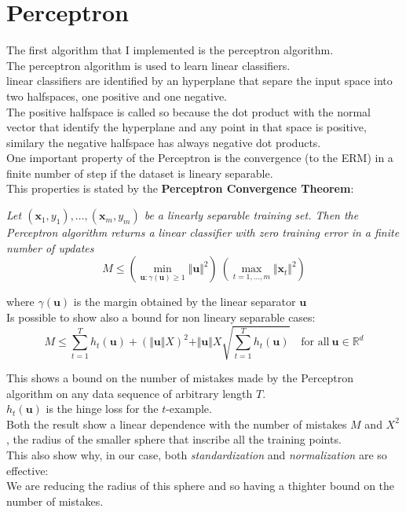 \newpage
\section{Perceptron}

The first algorithm that I implemented is the perceptron algorithm.\\
The perceptron algorithm is used to learn linear classifiers.\\
linear classifiers are identified by an hyperplane that separe the input space into two halfspaces, one positive and one negative.\\
The positive halfspace is called so because the dot product with the normal vector that identify the hyperplane and any point in that space is positive, similary the negative halfspace has always negative dot products.\\
One important property of the Perceptron is the convergence (to the ERM) in a finite number of step if the dataset is lineary separable.\\
This properties is stated by the \textbf{Perceptron Convergence Theorem}:

\textit{Let $(\boldsymbol{x}_1 , y_1 ), \dots, (\boldsymbol{x}_m , y_m)$ be a linearly separable training set. Then the Perceptron algorithm returns a linear classifier with zero training error in a finite number of updates}
$$
M \leq \left(\underset{\boldsymbol{u} : \gamma(\boldsymbol{u}) \geq 1}{\min} \Vert \boldsymbol{u} \Vert^2 \right) \ \left( \underset{t = 1, \dots, m}{\max} \Vert \boldsymbol{x}_t \Vert^2 \right)
$$

where $\gamma (\boldsymbol{u})$ is the margin obtained by the linear separator $\boldsymbol{u}$\\ 
 
Is possible to show also a bound for non lineary separable cases:\\

$$
M \leq \sum_{t=1}^{T} h_{t}(\boldsymbol{u}) + (\Vert \boldsymbol{u} \Vert X)^2 + \Vert \boldsymbol{u} \Vert X \sqrt{\sum_{t=1}^{T}h_t (\boldsymbol{u})} \quad \text{for all}\ \boldsymbol{u} \in \mathbb{R}^d    
$$

This shows a bound on the number of mistakes made by the Perceptron algorithm on any data sequence of arbitrary length $T$.\\
$h_{t}(\boldsymbol{u})$ is the hinge loss for the $t$-example.\\

Both the result show a linear dependence with the number of mistakes $M$ and  $X^2$, the radius of the smaller sphere that inscribe all the training points.\\
This also show why, in our case, both \textit{standardization} and \textit{normalization} are so effective:\\
We are reducing the radius of this sphere and so having a thighter bound on the number of mistakes.\\



